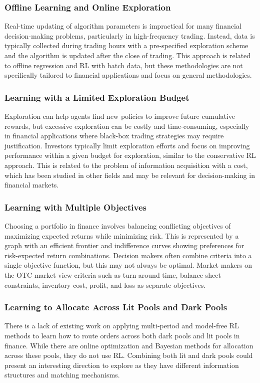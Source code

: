 \documentclass{article}
\begin{document}
\subsubsection{Offline Learning and Online Exploration}
Real-time updating of algorithm parameters is impractical for many financial decision-making problems, particularly in high-frequency trading. Instead, data is typically collected during trading hours with a pre-specified exploration scheme and the algorithm is updated after the close of trading. This approach is related to offline regression and RL with batch data, but these methodologies are not specifically tailored to financial applications and focus on general methodologies.

\subsubsection{Learning with a Limited Exploration Budget}
Exploration can help agents find new policies to improve future cumulative rewards, but excessive exploration can be costly and time-consuming, especially in financial applications where black-box trading strategies may require justification. Investors typically limit exploration efforts and focus on improving performance within a given budget for exploration, similar to the conservative RL approach. This is related to the problem of information acquisition with a cost, which has been studied in other fields and may be relevant for decision-making in financial markets.

\subsubsection{Learning with Multiple Objectives}
Choosing a portfolio in finance involves balancing conflicting objectives of maximizing expected returns while minimizing risk. This is represented by a graph with an efficient frontier and indifference curves showing preferences for risk-expected return combinations. Decision makers often combine criteria into a single objective function, but this may not always be optimal. Market makers on the OTC market view criteria such as turn around time, balance sheet constraints, inventory cost, profit, and loss as separate objectives.

\subsubsection{Learning to Allocate Across Lit Pools and Dark Pools}
There is a lack of existing work on applying multi-period and model-free RL methods to learn how to route orders across both dark pools and lit pools in finance. While there are online optimization and Bayesian methods for allocation across these pools, they do not use RL. Combining both lit and dark pools could present an interesting direction to explore as they have different information structures and matching mechanisms.
\end{document}
